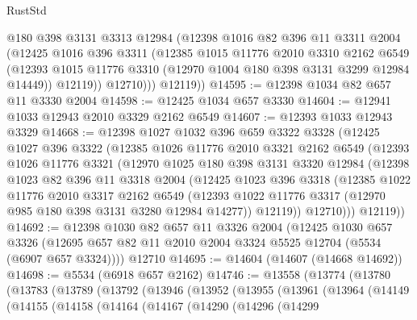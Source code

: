 \begin{lexlean}{RustStd}
\begin{coremodule}
            @180
            @398
            @3131
            @3313
            @12984
            (@12398
              @1016
              @82
              @396
              @11
              @3311
              @2004
              (@12425
                @1016
                @396
                @3311
                (@12385
                  @1015
                  @11776
                  @2010
                  @3310
                  @2162
                  @6549
                  (@12393 @1015 @11776 @3310 (@12970 @1004 @180 @398 @3131 @3299 @12984 @14449))
                  @12119))
              @12710)))
        @12119))
@14595 := @12398 @1034 @82 @657 @11 @3330 @2004
@14598 := @12425 @1034 @657 @3330
@14604 := @12941 @1033 @12943 @2010 @3329 @2162 @6549
@14607 := @12393 @1033 @12943 @3329
@14668 := @12398
    @1027
    @1032
    @396
    @659
    @3322
    @3328
    (@12425
      @1027
      @396
      @3322
      (@12385
        @1026
        @11776
        @2010
        @3321
        @2162
        @6549
        (@12393
          @1026
          @11776
          @3321
          (@12970
            @1025
            @180
            @398
            @3131
            @3320
            @12984
            (@12398
              @1023
              @82
              @396
              @11
              @3318
              @2004
              (@12425
                @1023
                @396
                @3318
                (@12385
                  @1022
                  @11776
                  @2010
                  @3317
                  @2162
                  @6549
                  (@12393 @1022 @11776 @3317 (@12970 @985 @180 @398 @3131 @3280 @12984 @14277))
                  @12119))
              @12710)))
        @12119))
@14692 := @12398
    @1030
    @82
    @657
    @11
    @3326
    @2004
    (@12425
      @1030
      @657
      @3326
      (@12695 @657 @82 @11 @2010 @2004 @3324 @5525 @12704 (@5534 (@6907 @657 @3324))))
    @12710
@14695 := @14604 (@14607 (@14668 @14692))
@14698 := @5534 (@6918 @657 @2162)
@14746 := @13558
    (@13774
      (@13780
        (@13783
          (@13789
            (@13792
              (@13946
                (@13952
                  (@13955
                    (@13961
                      (@13964
                        (@14149
                          (@14155
                            (@14158
                              (@14164
                                (@14167
                                  (@14290
                                    (@14296
                                      (@14299

\end{coremodule}
\end{lexlean}
